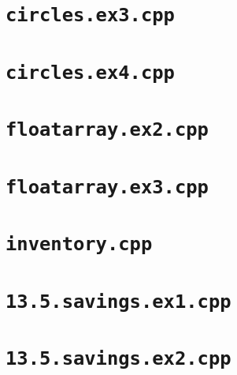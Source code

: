 \documentclass[11pt]{article}
\begin{document}
\section*{\texttt{circles.ex3.cpp}}

\newpage

\section*{\texttt{circles.ex4.cpp}}

\newpage

\section*{\texttt{floatarray.ex2.cpp}}

\newpage

\section*{\texttt{floatarray.ex3.cpp}}

\newpage

\section*{\texttt{inventory.cpp}}

\newpage

\section*{\texttt{13.5.savings.ex1.cpp}}

\newpage

\section*{\texttt{13.5.savings.ex2.cpp}}

\newpage
\end{document}
